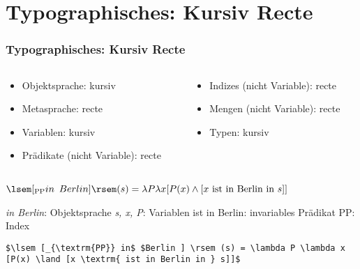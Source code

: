 \section{Typographisches: Kursiv \vs Recte}

\begin{frame}[fragile]
\frametitle{Typographisches: Kursiv \vs Recte}

\begin{columns}
\begin{column}[t]{.5\textwidth}
\begin{itemize}
	\item Objektsprache: kursiv
	\item Metasprache: recte
	\item Variablen: kursiv
	\item Prädikate (nicht Variable): recte
\end{itemize}	

\end{column}
\begin{column}[t]{.5\textwidth}

\begin{itemize}
	\item Indizes (nicht Variable): recte	
	\item Mengen (nicht Variable): recte
	\item Typen: kursiv
\end{itemize}	

\end{column}
\end{columns}

\pause

\ea $\lsem [_{\textrm{PP}} in$ $Berlin ] \rsem (s) = \lambda P \lambda x [P(x) \land [x \textrm{ ist in Berlin in } s]]$

	\ea \emph{in Berlin}: Objektsprache
	\ex \emph{s, x, P}: Variablen
	\ex \textrm{ist in Berlin}: invariables Prädikat
	\ex \textrm{PP}: Index
	\z 
\z 

\pause 

{\footnotesize
\begin{lstlisting}
$\lsem [_{\textrm{PP}} in$ $Berlin ] \rsem (s) = \lambda P \lambda x 
[P(x) \land [x \textrm{ ist in Berlin in } s]]$
\end{lstlisting}
}

\end{frame}


